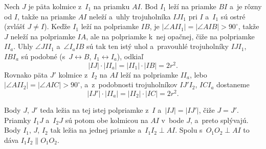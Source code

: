 {    Nech $J$ je päta kolmice z~$I_1$ na priamku $AI$. Bod $I_1$ leží na priamke $BI$ a~je rôzny od $I$, takže na priamke $AI$ neleží a~uhly trojuholníka $IJI_1$ pri $I$ a~$I_1$ sú ostré (zvlášť $J \neq I$). Keďže $I_1$ leží na polpriamke $IB$, je $|\angle AII_1| = |\angle AIB| > 90^\circ$, takže $J$ neleží na polpriamke $IA$, ale na polpriamke k~nej opačnej, čiže na polpriamke $II_a$. Uhly $\angle JII_1$ a~$\angle I_aIB$ sú tak ten istý uhol a~pravouhlé trojuholníky $IJI_1$, $IBI_a$ sú podobné (s~$J \leftrightarrow B$, $I_1 \leftrightarrow I_a$), odkiaľ
    $$
    |IJ| \cdot |II_a| = |II_1| \cdot |IB| = 2r^2.
    $$
    Rovnako päta $J'$ kolmice z~$I_2$ na $AI$ leží na polpriamke $II_a$, lebo $|\angle AII_2| = |\angle AIC| > 90^\circ$, a~z~podobnosti trojuholníkov $IJ'I_2$, $ICI_a$ dostaneme
    $$
    |IJ'| \cdot |II_a| = |II_2| \cdot |IC| = 2r^2.
    $$

    Body $J$, $J'$ teda ležia na tej istej polpriamke z~$I$ a~$|IJ| = |IJ'|$, čiže $J = J'$. Priamky $I_1J$ a~$I_2J$ sú potom obe kolmicou na $AI$ v~bode $J$, a~preto splývajú. Body $I_1$, $J$, $I_2$ tak ležia na jednej priamke a~$I_1I_2 \perp AI$. Spolu s~$O_1O_2 \perp AI$ to dáva $I_1I_2 \parallel O_1O_2$.
}

